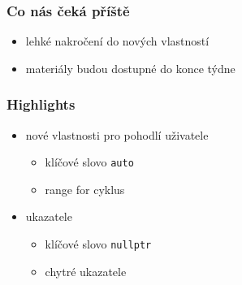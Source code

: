 \begin{frame}
	\frametitle{Co nás čeká příště}
	\begin{itemize}
		\item{lehké nakročení do nových vlastností}
		\item{materiály budou dostupné do konce týdne}
	\end{itemize}
\end{frame}

\begin{frame}
	\frametitle{Highlights}
	\begin{itemize}
		\item nové vlastnosti pro pohodlí uživatele
		\begin{itemize}
			\item{klíčové slovo \texttt{auto}}
			\item{range for cyklus}
		\end{itemize}
		\item ukazatele
		\begin{itemize}
			\item{klíčové slovo \texttt{nullptr}}
			\item{chytré ukazatele}
		\end{itemize}
	\end{itemize}
\end{frame}




